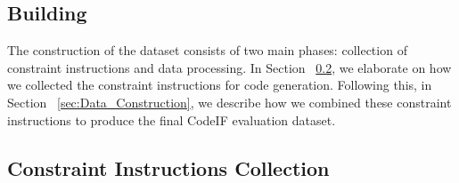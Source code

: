 \subsection{Building}
The construction of the \bench{} dataset consists of two main phases: collection of constraint instructions and data processing. In Section ~\ref{sec:Constraint_Instructions_Collection}, we elaborate on how we collected the constraint instructions for code generation. Following this, in Section ~\ref{sec:Data_Construction}, we describe how we combined these constraint instructions to produce the final CodeIF evaluation dataset.

\subsection{Constraint Instructions Collection}
\label{sec:Constraint_Instructions_Collection}




